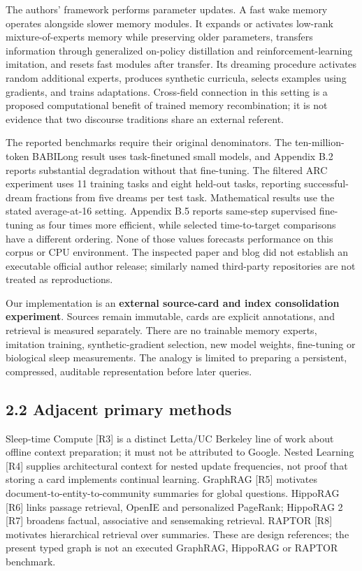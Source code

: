 \documentclass[
  10pt,
]{article}
\begin{document}
The authors' framework performs parameter updates. A fast wake memory
operates alongside slower memory modules. It expands or activates
low-rank mixture-of-experts memory while preserving older parameters,
transfers information through generalized on-policy distillation and
reinforcement-learning imitation, and resets fast modules after
transfer. Its dreaming procedure activates random additional experts,
produces synthetic curricula, selects examples using gradients, and
trains adaptations. Cross-field connection in this setting is a proposed
computational benefit of trained memory recombination; it is not
evidence that two discourse traditions share an external referent.

The reported benchmarks require their original denominators. The
ten-million-token BABILong result uses task-finetuned small models, and
Appendix B.2 reports substantial degradation without that fine-tuning.
The filtered ARC experiment uses 11 training tasks and eight held-out
tasks, reporting successful-dream fractions from five dreams per test
task. Mathematical results use the stated average-at-16 setting.
Appendix B.5 reports same-step supervised fine-tuning as four times more
efficient, while selected time-to-target comparisons have a different
ordering. None of those values forecasts performance on this corpus or
CPU environment. The inspected paper and blog did not establish an
executable official author release; similarly named third-party
repositories are not treated as reproductions.

Our implementation is an \textbf{external source-card and index
consolidation experiment}. Sources remain immutable, cards are explicit
annotations, and retrieval is measured separately. There are no
trainable memory experts, imitation training, synthetic-gradient
selection, new model weights, fine-tuning or biological sleep
measurements. The analogy is limited to preparing a persistent,
compressed, auditable representation before later queries.

\subsection{2.2 Adjacent primary
methods}\label{adjacent-primary-methods}

Sleep-time Compute {[}R3{]} is a distinct Letta/UC Berkeley line of work
about offline context preparation; it must not be attributed to Google.
Nested Learning {[}R4{]} supplies architectural context for nested
update frequencies, not proof that storing a card implements continual
learning. GraphRAG {[}R5{]} motivates document-to-entity-to-community
summaries for global questions. HippoRAG {[}R6{]} links passage
retrieval, OpenIE and personalized PageRank; HippoRAG 2 {[}R7{]}
broadens factual, associative and sensemaking retrieval. RAPTOR {[}R8{]}
motivates hierarchical retrieval over summaries. These are design
references; the present typed graph is not an executed GraphRAG,
HippoRAG or RAPTOR benchmark.
\end{document}
